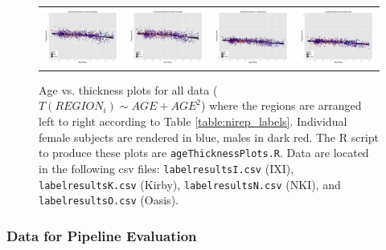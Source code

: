 \begin{figure}
\begin{tabular}{cccc}
  \includegraphics[width=35mm]{Figures/label29_results.pdf} &
  \includegraphics[width=35mm]{Figures/label30_results.pdf} &
  \includegraphics[width=35mm]{Figures/label31_results.pdf} &
  \includegraphics[width=35mm]{Figures/label32_results.pdf} \\
  \end{tabular}
  \caption{Age vs. thickness plots for all data ($T(REGION_i) \sim AGE + AGE^2$)
  where the regions are arranged left to right according to Table 
  \ref{table:nirep_labels}.
  Individual female subjects are rendered in blue, males in dark red.  The R script to produce these plots are {\tt ageThicknessPlots.R}.  
  Data are located in the following csv files: 
{\tt labelresultsI.csv} (IXI), 
{\tt labelresultsK.csv} (Kirby),
{\tt labelresultsN.csv} (NKI), and
{\tt labelresultsO.csv} (Oasis).
  }
  \label{fig:thicknessPlots}
\end{figure}



\subsubsection{Data for Pipeline Evaluation}

